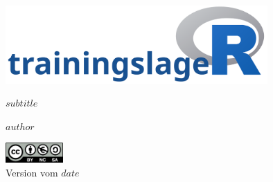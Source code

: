 \setlength\parindent{0pt}      %
\begin{titlepage}
  \begin{center}
  \includegraphics[width=100mm]{images/trainingslageR_white.png}

  \vspace{10mm}
  \begin{minipage}[]{0.85\textwidth}
    \begin{center}
      {\color{HSNRblue1}
      \Huge $subtitle$
      }
    \end{center}
  \end{minipage}

  \vspace{6mm}

  \normalsize $author$

   \vspace{10mm}


  \vfill
  \includegraphics[width=22mm]{images/ccbyncsa.png}\\
  \footnotesize Version vom $date$
  \end{center}

\thispagestyle{empty}
\end{titlepage}
